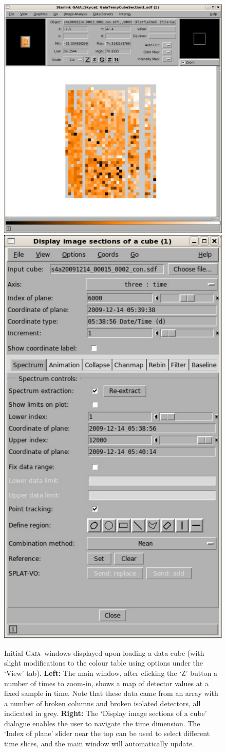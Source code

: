 \documentclass[twoside,11pt]{article}
\newcommand{\xref}[3]{#1}
\renewcommand{\_}{\texttt{\symbol{95}}}
\newcommand{\gaia}{\xref{\textsc{Gaia}}{sun214}{}}
\begin{document}
\begin{figure}
\begin{center}
\includegraphics[width=0.61\linewidth]{sc19_gaia_main}\hspace{0.03\linewidth}
\includegraphics[width=0.33\linewidth]{sc19_gaia_sections}
\caption{Initial \gaia\ windows displayed upon loading a data cube
  (with slight modifications to the colour table using options under
  the `View' tab). {\bf Left:} The main window, after clicking the `Z'
  button a number of times to zoom-in, shows a map of detector values
  at a fixed sample in time. Note that these data came from an array
  with a number of broken columns and broken isolated detectors, all
  indicated in grey. {\bf Right:} The `Display image sections of a
  cube' dialogue enables the user to navigate the time dimension. The
  `Index of plane' slider near the top can be used to select different
  time slices, and the main window will automatically update.}
\label{fig:gaia_main}
\end{center}
\end{figure}
\end{document}
